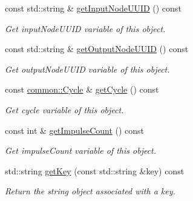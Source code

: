 \begin{DoxyCompactItemize}
const std\-::string \& \hyperlink{classcryomesh_1_1manager_1_1ConnectionDatabaseObject_a2e8384fe932c699e146511a628f16cff}{get\-Input\-Node\-U\-U\-I\-D} () const 
\begin{DoxyCompactList}\small\item\em \-Get input\-Node\-U\-U\-I\-D variable of this object. \end{DoxyCompactList}\item 
const std\-::string \& \hyperlink{classcryomesh_1_1manager_1_1ConnectionDatabaseObject_ab3488138917a89a2524c32d7999174c0}{get\-Output\-Node\-U\-U\-I\-D} () const 
\begin{DoxyCompactList}\small\item\em \-Get output\-Node\-U\-U\-I\-D variable of this object. \end{DoxyCompactList}\item 
const \hyperlink{classcryomesh_1_1common_1_1Cycle}{common\-::\-Cycle} \& \hyperlink{classcryomesh_1_1manager_1_1ConnectionDatabaseObject_acc8aa75ed2afb098ffba8cd79ed32b6b}{get\-Cycle} () const 
\begin{DoxyCompactList}\small\item\em \-Get cycle variable of this object. \end{DoxyCompactList}\item 
const int \& \hyperlink{classcryomesh_1_1manager_1_1ConnectionDatabaseObject_a6fe71c5af6d5e8c58546768c11f662f0}{get\-Impulse\-Count} () const 
\begin{DoxyCompactList}\small\item\em \-Get impulse\-Count variable of this object. \end{DoxyCompactList}\item 
std\-::string \hyperlink{classcryomesh_1_1manager_1_1DatabaseObject_a66ded4e1a1bccd65c94922648c7135c5}{get\-Key} (const std\-::string \&key) const 
\begin{DoxyCompactList}\small\item\em \-Return the string object associated with a key. \end{DoxyCompactList}\end{DoxyCompactItemize}
